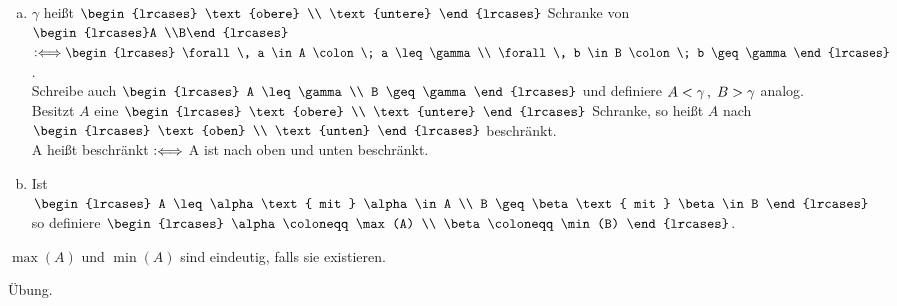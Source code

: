 \documentclass[../ana1.tex]{subfiles}
\begin{document}
\begin{defi*}\leavevmode
	\begin{enumerate}[(a)]
		\item \(\gamma \) heißt \(\begin{lrcases}
									\text{obere} \\
									\text{untere}
								 \end{lrcases} \) Schranke von \(\begin{lrcases}A \\B\end{lrcases} \)
			  \(\longeq \begin{lrcases}
							\forall \, a \in A \colon \; a \leq \gamma \\
							\forall \, b \in B \colon \; b \geq \gamma  
						\end{lrcases} \). \\
			  Schreibe auch \(\begin{lrcases}
								 A \leq \gamma \\ 
								 B \geq \gamma 
							  \end{lrcases} \)
			  und definiere \(A < \gamma \operatorname{,}  \; B > \gamma \) analog. \\
			  Besitzt \(A \) eine \(\begin{lrcases}
									  \text{obere} \\
									  \text{untere}
								   \end{lrcases} \) Schranke,
			  so heißt \(A \) nach \(\begin{lrcases}
									  \text{oben} \\
									  \text{unten}
								   \end{lrcases} \) beschränkt. \\
			  A heißt beschränkt \(\mathrel{\vcentcolon\Longleftrightarrow} \) A ist nach oben und unten beschränkt.
		\item Ist \(\begin{lrcases}
						A \leq \alpha \text{ mit } \alpha \in A \\
						B \geq \beta \text{ mit } \beta \in B
					\end{lrcases} \) so definiere
			  \(\begin{lrcases}
					\alpha \coloneqq \max(A) \\
					\beta \coloneqq \min(B)
				\end{lrcases} \).
	\end{enumerate}
\end{defi*}

\begin{bem}
	\(\max(A) \) und \(\min(A) \) sind eindeutig, falls sie existieren.
\end{bem}
\begin{bew}
	Übung.\phantom{\qedhere}
\end{bew}
\end{document}
